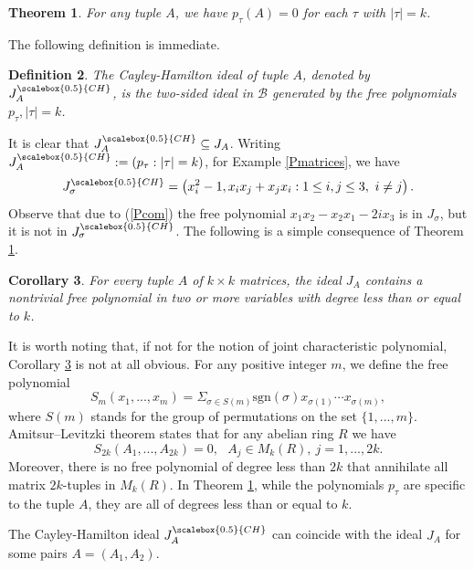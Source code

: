 \documentclass[draft, 12pt, reqno]{amsart}
\newcommand{\B}{{\mathcal B}}
\numberwithin{equation}{section}
\theoremstyle{plain}
\newtheorem{theorem}{Theorem}[section]
\newtheorem{corollary}[theorem]{Corollary}
\newtheorem{definition}[theorem]{Definition}
\begin{document}
\begin{theorem}\label{C-H}
For any tuple $A$, we have $p_\tau (A)=0$ for each $\tau$ with $|\tau|=k$.
\end{theorem}
The following definition is immediate.

\begin{definition}
The {\em Cayley-Hamilton ideal} of tuple $A$, denoted by $J_A^{\scalebox{0.5}{CH}}$, is the two-sided ideal in $\B$ generated by the free polynomials $p_\tau, |\tau|=k$.
\end{definition}
\noindent It is clear that $J_A^{\scalebox{0.5}{CH}}\subseteq J_A$. Writing $J_A^{\scalebox{0.5}{CH}}:=\left(p_\tau: |\tau|=k\right)$, for Example \ref{Pmatrices}, we have 
\[J_\sigma^{\scalebox{0.5}{CH}}=\left(x_i^2-1, x_ix_j+x_jx_i : 1\leq i, j\leq 3,\ i\neq j\right).\]Observe that due to (\ref{Pcom}) the free polynomial $x_1x_2-x_2x_1-2ix_3$ is in $J_\sigma$, but it is not in $J_\sigma^{\scalebox{0.5}{CH}}$. The following is a simple consequence of Theorem \ref{C-H}.
\begin{corollary}\label{annih}
For every tuple $A$ of $k\times k$ matrices, the ideal $J_A$ contains a nontrivial free polynomial in two or more variables with degree less than or equal to $k$.
\end{corollary}
It is worth noting that, if not for the notion of joint characteristic polynomial, Corollary \ref{annih} is not at all obvious. For any positive integer $m$, we define the free polynomial 
\[S_m(x_1, ..., x_m)=\Sigma_{\sigma\in S(m)}\text{sgn}(\sigma)x_{\sigma(1)}\cdots x_{\sigma(m)},\]where $S(m)$ stands for the group of permutations on the set $\{1, ..., m\}$.
Amitsur–Levitzki theorem \cite{AL} states that for any abelian ring $R$ we have 
\[S_{2k}(A_1, ..., A_{2k})=0,\ \ \ A_j\in M_k(R), \ j=1, ..., 2k.\] Moreover, there is no free polynomial of degree less than $2k$ that annihilate all matrix $2k$-tuples in $M_k(R)$. In Theorem \ref{C-H}, while the polynomials $p_\tau$ are specific to the tuple $A$, they are all of degrees less than or equal to $k$.

The Cayley-Hamilton ideal $J_A^{\scalebox{0.5}{CH}}$ can coincide with the ideal $J_A$ for some pairs $A=(A_1,A_2)$. 
\end{document}
